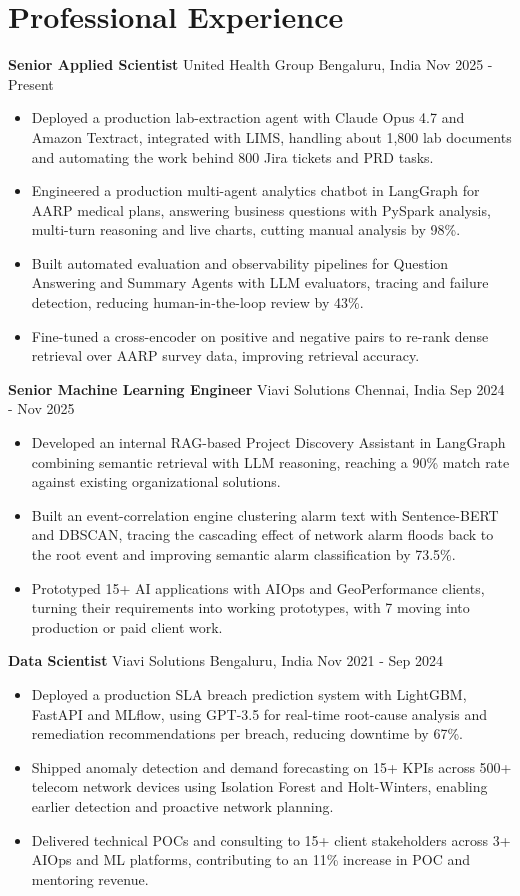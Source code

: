 \documentclass[10pt,a4paper]{article}
\newcommand{\role}[4]{\textbf{#1} \textbar{} #2 \hfill #3 \textbar{} #4\par}
\begin{document}
\section{Professional Experience}
\role{Senior Applied Scientist}{United Health Group}{Bengaluru, India}{Nov 2025 - Present}
\begin{itemize}
  \item Deployed a production lab-extraction agent with Claude Opus 4.7 and Amazon Textract, integrated with LIMS, handling about 1,800 lab documents and automating the work behind 800 Jira tickets and PRD tasks.
  \item Engineered a production multi-agent analytics chatbot in LangGraph for AARP medical plans, answering business questions with PySpark analysis, multi-turn reasoning and live charts, cutting manual analysis by 98\%.
  \item Built automated evaluation and observability pipelines for Question Answering and Summary Agents with LLM evaluators, tracing and failure detection, reducing human-in-the-loop review by 43\%.
  \item Fine-tuned a cross-encoder on positive and negative pairs to re-rank dense retrieval over AARP survey data, improving retrieval accuracy.
\end{itemize}
\vspace{3pt}
\role{Senior Machine Learning Engineer}{Viavi Solutions}{Chennai, India}{Sep 2024 - Nov 2025}
\begin{itemize}
  \item Developed an internal RAG-based Project Discovery Assistant in LangGraph combining semantic retrieval with LLM reasoning, reaching a 90\% match rate against existing organizational solutions.
  \item Built an event-correlation engine clustering alarm text with Sentence-BERT and DBSCAN, tracing the cascading effect of network alarm floods back to the root event and improving semantic alarm classification by 73.5\%.
  \item Prototyped 15+ AI applications with AIOps and GeoPerformance clients, turning their requirements into working prototypes, with 7 moving into production or paid client work.
\end{itemize}
\vspace{3pt}
\role{Data Scientist}{Viavi Solutions}{Bengaluru, India}{Nov 2021 - Sep 2024}
\begin{itemize}
  \item Deployed a production SLA breach prediction system with LightGBM, FastAPI and MLflow, using GPT-3.5 for real-time root-cause analysis and remediation recommendations per breach, reducing downtime by 67\%.
  \item Shipped anomaly detection and demand forecasting on 15+ KPIs across 500+ telecom network devices using Isolation Forest and Holt-Winters, enabling earlier detection and proactive network planning.
  \item Delivered technical POCs and consulting to 15+ client stakeholders across 3+ AIOps and ML platforms, contributing to an 11\% increase in POC and mentoring revenue.
\end{itemize}
\end{document}
